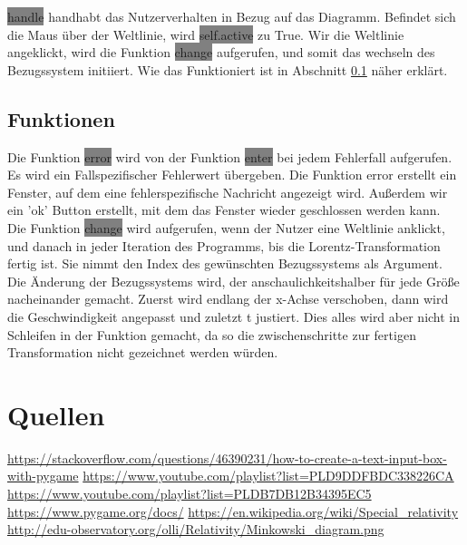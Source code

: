\documentclass[12pt]{article}
\begin{document}
\colorbox{gray}{handle} handhabt das Nutzerverhalten in Bezug auf das Diagramm.
Befindet sich die Maus über der Weltlinie, wird \colorbox{gray}{self.active} zu True.
Wir die Weltlinie angeklickt, wird die Funktion \colorbox{gray}{change} aufgerufen, und somit das wechseln des Bezugssystem initiiert.
Wie das Funktioniert ist in Abschnitt \ref{func} näher erklärt.
\subsection{Funktionen}
\label{func}
Die Funktion \colorbox{gray}{error} wird von der Funktion \colorbox{gray}{enter} bei jedem Fehlerfall aufgerufen.
Es wird ein Fallspezifischer Fehlerwert übergeben.
Die Funktion error erstellt ein Fenster, auf dem eine fehlerspezifische Nachricht angezeigt wird.
Außerdem wir ein 'ok' Button erstellt, mit dem das Fenster wieder geschlossen werden kann.
\\

Die Funktion \colorbox{gray}{change} wird aufgerufen, wenn der Nutzer eine Weltlinie anklickt, und danach in jeder Iteration des Programms, bis die Lorentz-Transformation fertig ist.
Sie nimmt den Index des gewünschten Bezugssystems als Argument.
Die Änderung der Bezugssystems wird, der anschaulichkeitshalber für jede Größe nacheinander gemacht.
Zuerst wird endlang der x-Achse verschoben, dann wird die Geschwindigkeit angepasst und zuletzt t justiert.
Dies alles wird aber nicht in Schleifen in der Funktion gemacht, da so die zwischenschritte zur fertigen Transformation nicht gezeichnet werden würden.
\section{Quellen}
\url{https://stackoverflow.com/questions/46390231/how-to-create-a-text-input-box-with-pygame}
\url{https://www.youtube.com/playlist?list=PLD9DDFBDC338226CA}
\url{https://www.youtube.com/playlist?list=PLDB7DB12B34395EC5}
\url{https://www.pygame.org/docs/}
\url{https://en.wikipedia.org/wiki/Special_relativity}
\url{http://edu-observatory.org/olli/Relativity/Minkowski_diagram.png}
\end{document}
